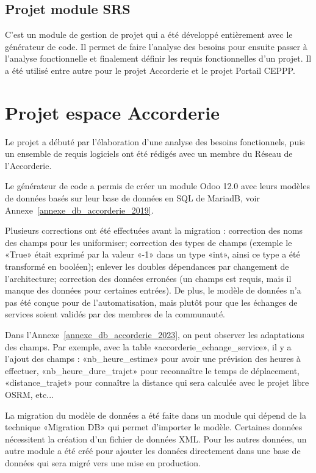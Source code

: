 \subsection{Projet module SRS}

C’est un module de gestion de projet qui a été développé entièrement avec le générateur de code. Il permet de faire l’analyse des besoins pour ensuite passer à l’analyse fonctionnelle et finalement définir les requis fonctionnelles d’un projet. Il a été utilisé entre autre pour le projet Accorderie et le projet Portail CEPPP.

\section{Projet espace Accorderie}

Le projet a débuté par l'élaboration d'une analyse des besoins fonctionnels, puis un ensemble de requis logiciels ont été rédigés avec un membre du Réseau de l'Accorderie. %

Le générateur de code a permis de créer un module Odoo 12.0 avec leurs modèles de données basés sur leur base de données en SQL de MariadB, voir Annexe~\ref{annexe_db_accorderie_2019}.

Plusieurs corrections ont été effectuées avant la migration : correction des noms des champs pour les uniformiser; correction des types de champs (exemple le «True» était exprimé par la valeur «-1» dans un type «int», ainsi ce type a été transformé en booléen); enlever les doubles dépendances par changement de l’architecture; correction des données erronées (un champs est requis, mais il manque des données pour certaines entrées). De plus, le modèle de données n’a pas été conçue pour de l’automatisation, mais plutôt pour que les échanges de services soient validés par des membres de la communauté.

Dans l'Annexe~\ref{annexe_db_accorderie_2023}, on peut observer les adaptations des champs. Par exemple, avec la table «accorderie\_echange\_service», il y a l'ajout des champs : «nb\_heure\_estime» pour avoir une prévision des heures à effectuer, «nb\_heure\_dure\_trajet» pour reconnaître le temps de déplacement, «distance\_trajet» pour connaître la distance qui sera calculée avec le projet libre OSRM, etc...

La migration du modèle de données a été faite dans un module qui dépend de la technique «Migration DB» qui permet d'importer le modèle. Certaines données nécessitent la création d’un fichier de données XML. Pour les autres données, un autre module a été créé pour ajouter les données directement dans une base de données qui sera migré vers une mise en production.

